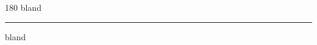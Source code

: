 
\begin{frame}
\begin{center}
\begin{turn}{180}
{\fontsize{2.5cm}{1em}\selectfont bland}
\end{turn}
\vspace{1em}\par  
\hrule
\vspace{1em}\par  
{\fontsize{2.5cm}{1em}\selectfont bland}
\end{center}
\end{frame}
